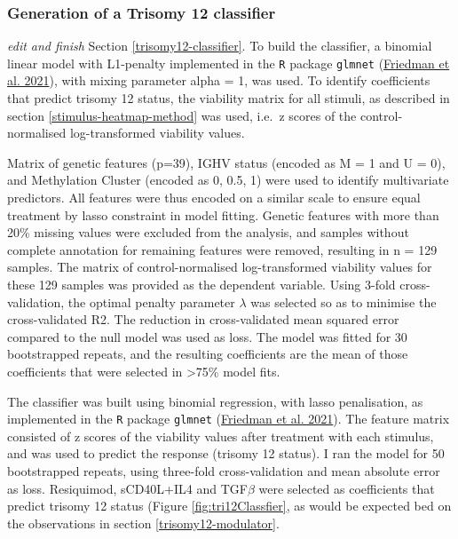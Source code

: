 \documentclass[11pt, a4paper, twosided]{book}
\begin{document}
\hypertarget{trisomy12-classifier-method}{%
\subsubsection{Generation of a Trisomy 12 classifier}\label{trisomy12-classifier-method}}

\emph{edit and finish}
Section \ref{trisomy12-classifier}. To build the classifier, a binomial linear model with L1-penalty implemented in the \texttt{R} package \texttt{glmnet} (\protect\hyperlink{ref-R-glmnet}{Friedman et al. 2021}), with mixing parameter alpha = 1, was used. To identify coefficients that predict trisomy 12 status, the viability matrix for all stimuli, as described in section \ref{stimulus-heatmap-method} was used, i.e.~z scores of the control-normalised log-transformed viability values.

Matrix of genetic features (p=39), IGHV status (encoded as M = 1 and U = 0), and Methylation Cluster (encoded as 0, 0.5, 1) were used to identify multivariate predictors. All features were thus encoded on a similar scale to ensure equal treatment by lasso constraint in model fitting. Genetic features with more than 20\% missing values were excluded from the analysis, and samples without complete annotation for remaining features were removed, resulting in n = 129 samples. The matrix of control-normalised log-transformed viability values for these 129 samples was provided as the dependent variable. Using 3-fold cross-validation, the optimal penalty parameter \(\lambda\) was selected so as to minimise the cross-validated R2. The reduction in cross-validated mean squared error compared to the null model was used as loss. The model was fitted for 30 bootstrapped repeats, and the resulting coefficients are the mean of those coefficients that were selected in \textgreater75\% model fits.

The classifier was built using binomial regression, with lasso penalisation, as implemented in the \texttt{R} package \texttt{glmnet} (\protect\hyperlink{ref-R-glmnet}{Friedman et al. 2021}). The feature matrix consisted of z scores of the viability values after treatment with each stimulus, and was used to predict the response (trisomy 12 status). I ran the model for 50 bootstrapped repeats, using three-fold cross-validation and mean absolute error as loss. Resiquimod, sCD40L+IL4 and TGF\(\beta\) were selected as coefficients that predict trisomy 12 status (Figure \ref{fig:tri12Classfier}, as would be expected bed on the observations in section \ref{trisomy12-modulator}.
\end{document}
